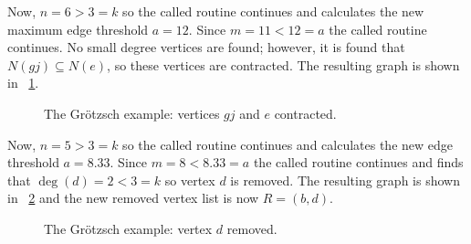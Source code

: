Now, \(n=6>3=k\) so the called routine continues and calculates the new maximum edge threshold \(a=12\).  Since
\(m=11<12=a\) the called routine continues.  No small degree vertices are found; however, it is found that
\(N(gj)\subseteq N(e)\), so these vertices are contracted.  The resulting graph is shown in
\figurename~\ref{fig:ex:congje}.

\begin{figure}[H]
  \centering
  \caption{The Gr\"otzsch example: vertices \(gj\) and \(e\) contracted.}
  \label{fig:ex:congje}
\end{figure}

Now, \(n=5>3=k\) so the called routine continues and calculates the new edge threshold \(a=8.33\).  Since
\(m=8<8.33=a\) the called routine continues and finds that \(\deg(d)=2<3=k\) so vertex \(d\) is removed.  The
resulting graph is shown in \figurename~\ref{fig:ex:remd} and the new removed vertex list is now \(R=(b,d)\).

\begin{figure}[H]
  \centering
  \caption{The Gr\"otzsch example: vertex \(d\) removed.}
  \label{fig:ex:remd}
\end{figure}

